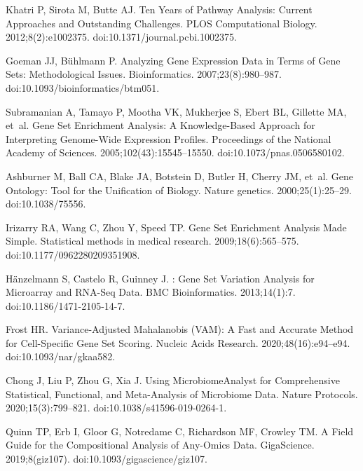 \documentclass[10pt,letterpaper]{article}
\begin{document}
\begin{thebibliography}{10}
Khatri P, Sirota M, Butte AJ.
\newblock Ten {{Years}} of {{Pathway Analysis}}: {{Current Approaches}} and
  {{Outstanding Challenges}}.
\newblock PLOS Computational Biology. 2012;8(2):e1002375.
\newblock doi:{10.1371/journal.pcbi.1002375}.

Goeman JJ, B{\"u}hlmann P.
\newblock Analyzing Gene Expression Data in Terms of Gene Sets: Methodological
  Issues.
\newblock Bioinformatics. 2007;23(8):980--987.
\newblock doi:{10.1093/bioinformatics/btm051}.

Subramanian A, Tamayo P, Mootha VK, Mukherjee S, Ebert BL, Gillette MA, et~al.
\newblock Gene Set Enrichment Analysis: {{A}} Knowledge-Based Approach for
  Interpreting Genome-Wide Expression Profiles.
\newblock Proceedings of the National Academy of Sciences.
  2005;102(43):15545--15550.
\newblock doi:{10.1073/pnas.0506580102}.

Ashburner M, Ball CA, Blake JA, Botstein D, Butler H, Cherry JM, et~al.
\newblock Gene {{Ontology}}: Tool for the Unification of Biology.
\newblock Nature genetics. 2000;25(1):25--29.
\newblock doi:{10.1038/75556}.

Irizarry RA, Wang C, Zhou Y, Speed TP.
\newblock Gene {{Set Enrichment Analysis Made Simple}}.
\newblock Statistical methods in medical research. 2009;18(6):565--575.
\newblock doi:{10.1177/0962280209351908}.

H{\"a}nzelmann S, Castelo R, Guinney J.
: Gene Set Variation Analysis for Microarray and {{RNA-Seq}}
  Data.
\newblock BMC Bioinformatics. 2013;14(1):7.
\newblock doi:{10.1186/1471-2105-14-7}.

Frost HR.
\newblock Variance-Adjusted {{Mahalanobis}} ({{VAM}}): A Fast and Accurate
  Method for Cell-Specific Gene Set Scoring.
\newblock Nucleic Acids Research. 2020;48(16):e94--e94.
\newblock doi:{10.1093/nar/gkaa582}.

Chong J, Liu P, Zhou G, Xia J.
\newblock Using {{MicrobiomeAnalyst}} for Comprehensive Statistical,
  Functional, and Meta-Analysis of Microbiome Data.
\newblock Nature Protocols. 2020;15(3):799--821.
\newblock doi:{10.1038/s41596-019-0264-1}.

Quinn TP, Erb I, Gloor G, Notredame C, Richardson MF, Crowley TM.
\newblock A Field Guide for the Compositional Analysis of Any-Omics Data.
\newblock GigaScience. 2019;8(giz107).
\newblock doi:{10.1093/gigascience/giz107}.


\end{thebibliography}
\end{document}
